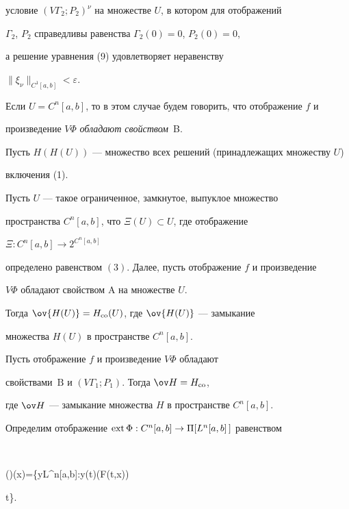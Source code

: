 условие $(V\Gamma_2;P_2)^\nu$ на множестве $U$, в котором для отображений


$\Gamma_2$, $P_2$ справедливы равенства $\Gamma_2(0)=0$, $P_2(0)=0$,


а решение уравнения (9) удовлетворяет неравенству


$\|\xi_\nu\|_{C^1[a,b]}<\varepsilon$.


Если $U=C^n[a,b]$, то в этом случае будем говорить, что отображение $f$ и


произведение $V\Phi$ {\it обладают свойством}~B.


Пусть $H(H(U))$ --- множество всех решений (принадлежащих множеству $U$)


включения (1).





\begin{thm} Пусть $U$ --- такое ограниченное, замкнутое, выпуклое множество


пространства $C^n[a,b]$, что $\Xi(U)\subset U$, где отображение


$\Xi:C^n[a,b]\to 2^{C^n[a,b]}$


определено равенством $(3)$. Далее, пусть отображение $f$ и произведение


$V\Phi$ обладают свойством $\mathrm A$ на множестве $U$.


Тогда $\ov{H(U)}=H_{\co}(U)$, где $\ov{H(U)}$ --- замыкание


множества $H(U)$ в пространстве $C^n[a,b]$.


\end{thm}





\begin{cor} Пусть отображение $f$ и произведение $V\Phi$ обладают


свойствами~$\mathrm B$ и $(V\Gamma_1;P_1)$. Тогда $\ov H=H_{\co}$,


где $\ov H$ --- замыкание множества $H$ в пространстве $C^n[a,b]$.


\end{cor}





Определим отображение $\operatorname{ext}\Phi:C^n[a,b]\to\Pi[L^n[a,b]\,]$ равенством


$$


(\ext\Phi)(x)=\{y\in L^n[a,b]:y(t)\in\ov{\ext}(\co F(t,x))


 t\in[a,b]\}.


